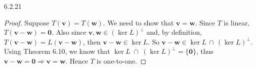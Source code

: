 \documentclass{article}
\theoremstyle{definition}
\def\v{\mathbf{v}}
\def\w{\mathbf{w}}
\def\0{\mathbf{0}}
\begin{document}
    \begin{prob}{6.2.21} $ $
        \begin{proof}
            Suppose $T(\v) = T(\w)$. We need to show that $\v=\w$. Since $T$ is linear, $T(\v-\w) = \0$. Also since $\v,\w \in (\ker L)^{\perp}$ and, by definition, $T(\v-\w) = L(\v-\w)$, then $\v-\w \in \ker L$. So $\v-\w \in \ker L \, \cap \, (\ker L)^{\perp}$. Using Theorem 6.10, we know that $\ker L \; \cap \; (\ker L)^{\perp} = \{ \0 \}$, thus $\v - \w = \0 \Rightarrow \v = \w$. Hence $T$ is one-to-one.
        \end{proof}
    \end{prob}
	
    
    
\end{document}
